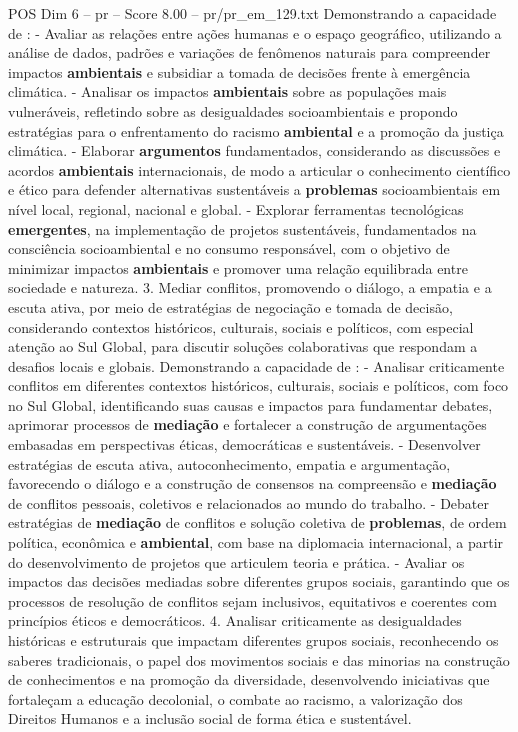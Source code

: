 \begin{textsample}{POS Dim 6 – pr – Score 8.00 – pr/pr\_em\_129.txt}
Demonstrando a capacidade de : - Avaliar as relações entre ações humanas e o espaço geográfico, utilizando a análise de dados, padrões e variações de fenômenos naturais para compreender impactos \textbf{ambientais} e subsidiar a tomada de decisões frente à emergência climática. - Analisar os impactos \textbf{ambientais} sobre as populações mais vulneráveis, refletindo sobre as desigualdades socioambientais e propondo estratégias para o enfrentamento do racismo \textbf{ambiental} e a promoção da justiça climática. - Elaborar \textbf{argumentos} fundamentados, considerando as discussões e acordos \textbf{ambientais} internacionais, de modo a articular o conhecimento científico e ético para defender alternativas sustentáveis a \textbf{problemas} socioambientais em nível local, regional, nacional e global. - Explorar ferramentas tecnológicas \textbf{emergentes}, na implementação de projetos sustentáveis, fundamentados na consciência socioambiental e no consumo responsável, com o objetivo de minimizar impactos \textbf{ambientais} e promover uma relação equilibrada entre sociedade e natureza. 3.
Mediar conflitos, promovendo o diálogo, a empatia e a escuta ativa, por meio de estratégias de negociação e tomada de decisão, considerando contextos históricos, culturais, sociais e políticos, com especial atenção ao Sul Global, para discutir soluções colaborativas que respondam a desafios locais e globais.
Demonstrando a capacidade de : - Analisar criticamente conflitos em diferentes contextos históricos, culturais, sociais e políticos, com foco no Sul Global, identificando suas causas e impactos para fundamentar debates, aprimorar processos de \textbf{mediação} e fortalecer a construção de argumentações embasadas em perspectivas éticas, democráticas e sustentáveis. - Desenvolver estratégias de escuta ativa, autoconhecimento, empatia e argumentação, favorecendo o diálogo e a construção de consensos na compreensão e \textbf{mediação} de conflitos pessoais, coletivos e relacionados ao mundo do trabalho. - Debater estratégias de \textbf{mediação} de conflitos e solução coletiva de \textbf{problemas}, de ordem política, econômica e \textbf{ambiental}, com base na diplomacia internacional, a partir do desenvolvimento de projetos que articulem teoria e prática. - Avaliar os impactos das decisões mediadas sobre diferentes grupos sociais, garantindo que os processos de resolução de conflitos sejam inclusivos, equitativos e coerentes com princípios éticos e democráticos. 4.
Analisar criticamente as desigualdades históricas e estruturais que impactam diferentes grupos sociais, reconhecendo os saberes tradicionais, o papel dos movimentos sociais e das minorias na construção de conhecimentos e na promoção da diversidade, desenvolvendo iniciativas que fortaleçam a educação decolonial, o combate ao racismo, a valorização dos Direitos Humanos e a inclusão social de forma ética e sustentável.

\end{textsample}
